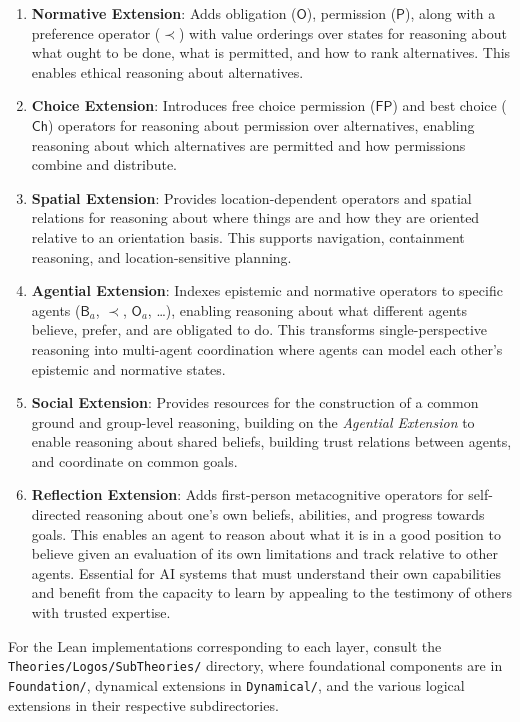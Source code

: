 \documentclass[../LogosReference.tex]{subfiles}
\begin{document}
\begin{enumerate}
	\item \textbf{Normative Extension}:
	      Adds obligation ($\mathsf{O}$), permission ($\mathsf{P}$), along with a preference operator ($\prec$) with value orderings over states for reasoning about what ought to be done, what is permitted, and how to rank alternatives.
	      This enables ethical reasoning about alternatives.

	\item \textbf{Choice Extension}:
	      Introduces free choice permission ($\mathsf{FP}$) and best choice ($\mathsf{Ch}$) operators for reasoning about permission over alternatives, enabling reasoning about which alternatives are permitted and how permissions combine and distribute.

	\item \textbf{Spatial Extension}:
	      Provides location-dependent operators and spatial relations for reasoning about where things are and how they are oriented relative to an orientation basis.
	      This supports navigation, containment reasoning, and location-sensitive planning.

	\item \textbf{Agential Extension}:
	      Indexes epistemic and normative operators to specific agents ($\mathsf{B}_a$, $\prec$, $\mathsf{O}_a$, \ldots), enabling reasoning about what different agents believe, prefer, and are obligated to do.
	      This transforms single-perspective reasoning into multi-agent coordination where agents can model each other's epistemic and normative states.

	\item \textbf{Social Extension}:
	      Provides resources for the construction of a common ground and group-level reasoning, building on the \textit{Agential Extension} to enable reasoning about shared beliefs, building trust relations between agents, and coordinate on common goals.

	\item \textbf{Reflection Extension}:
	      Adds first-person metacognitive operators for self-directed reasoning about one's own beliefs, abilities, and progress towards goals.
	      This enables an agent to reason about what it is in a good position to believe given an evaluation of its own limitations and track relative to other agents.
        Essential for AI systems that must understand their own capabilities and benefit from the capacity to learn by appealing to the testimony of others with trusted expertise.
\end{enumerate}
For the Lean implementations corresponding to each layer, consult the \texttt{Theories/Logos/SubTheories/} directory, where foundational components are in \texttt{Foundation/}, dynamical extensions in \texttt{Dynamical/}, and the various logical extensions in their respective subdirectories.
\end{document}
